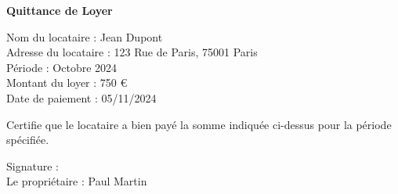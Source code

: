 \documentclass{article}
\begin{document}
\begin{center}
    \Large\textbf{Quittance de Loyer}
\end{center}

\noindent
Nom du locataire : Jean Dupont \\
Adresse du locataire : 123 Rue de Paris, 75001 Paris \\
Période : Octobre 2024 \\
Montant du loyer : 750 € \\
Date de paiement : 05/11/2024 \\

\vspace{1cm}

\noindent
Certifie que le locataire a bien payé la somme indiquée ci-dessus pour la période spécifiée.

\vspace{2cm}

\noindent
Signature : \\
Le propriétaire : Paul Martin
\end{document}
